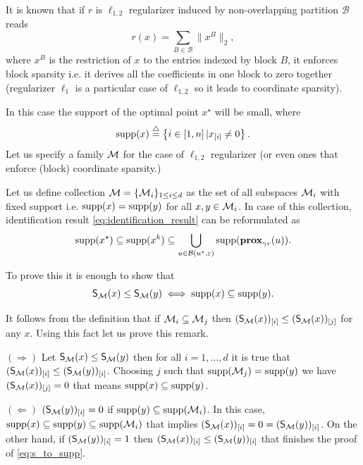 \begin{example}\label{ex:intro_coordinate_strata}
    It is known that if $r$ is $\ell_{1,2}$ regularizer induced by non-overlapping partition $\mathcal{B}$ reads
    \begin{equation}\label{eq:l12}
         r(x) = \sum\limits_{B\in\mathcal{B}}\|x^B\|_2, 
    \end{equation}
    where $x^B$ is the restriction of $x$ to the entries indexed by block $B$, it enforces block sparsity i.e. it derives all the coefficients in one block to zero together (regularizer $\ell_1$ is a particular case of $\ell_{1,2}$ so it leads to coordinate sparsity).
    
    In this case the support of the optimal point $x^\star$ will be small, where 
    \begin{equation}\label{eq:supp}
        \supp(x) \stackrel{\triangle}{=}\left\{i\in [1,n]\,| x_{[i]} \neq 0 \right\}.
    \end{equation}
    Let us specify a family $\M$ for the case of $\ell_{1,2}$ regularizer (or even ones that enforce (block) coordinate sparsity.)
    
    Let us define collection $\M = \{\M_i\}_{1\leq i\leq d}$ as the set of all subspaces $\M_i$ with fixed support i.e. $\supp(x) = \supp(y)$ for all $x,y\in \M_i$. In case of this collection, identification result \eqref{eq:identification_result} can be reformulated as
    \begin{equation}\label{eq:ident_l1}
        \supp(x^\star) \subseteq \supp(x^k) \subseteq \bigcup_{u\in\mathcal{B}(u^\star,\varepsilon)} \supp(\prox_{\gamma r}(u)).
    \end{equation}
    
    To prove this it is enough to show that
    \begin{equation}\label{eq:s_to_supp}
        \S(x)\leq\S(y) \iff \supp(x)\subseteq\supp(y).
    \end{equation}
    
    It follows from the definition that if $\M_i\subseteq \M_j$ then $(\S(x))_{[i]}\leq(\S(x))_{[j]}$ for any $x$. Using this fact let us prove this remark.
    
    $(\Rightarrow)$ Let  $\S(x)\leq\S(y)$ then for all $i = 1,\dots,d$ it is true that $(\S(x))_{[i]}\leq(\S(y))_{[i]}$. Choosing $j$ such that $\supp(\M_j) = \supp(y)$ we have $(\S(x))_{[j]}= 0$ that means $\supp(x)\subseteq\supp(y)$.
    
    $(\Leftarrow)$ $(\S(y))_{[i]} = 0$ if $\supp(y)\subseteq\supp(\M_i)$. In this case, $\supp(x)\subseteq\supp(y)\subseteq\supp(\M_i)$ that implies $(\S(x))_{[i]} = 0 = (\S(y))_{[i]}$. On the other hand, if $(\S(y))_{[i]} = 1$ then $(\S(x))_{[i]}\leq(\S(y))_{[i]}$ that finishes the proof of \eqref{eq:s_to_supp}.
\end{example}


